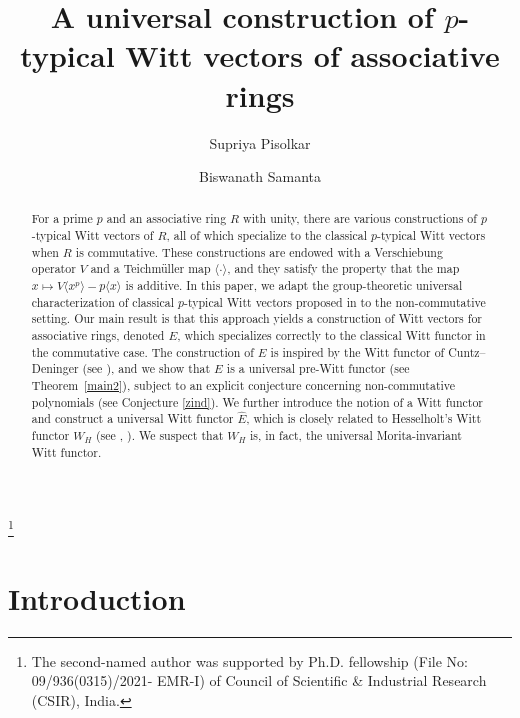 \documentclass[11pt]{amsart}
\theoremstyle{plain}
\theoremstyle{definition}
\newcommand{\ab}[1]{\langle {#1} \rangle}
\begin{document}
\title{A universal construction of $p$-typical Witt vectors of associative rings} 

\author[S. Pisolkar]{Supriya Pisolkar} \address{ Indian Institute of
Science, Education and Research (IISER),  Homi Bhabha Road, Pashan,
Pune - 411008, India}  

\author[B. Samanta] {Biswanath Samanta} \address{ Indian Institute of
Science, Education and Research (IISER),  Homi Bhabha Road, Pashan,
Pune - 411008, India}  

\thanks{The second-named author was supported by Ph.D. fellowship (File No: 09/936(0315)/2021-
EMR-I) of Council of Scientific \& Industrial Research (CSIR), India.} 
\maketitle 
\begin{abstract}
For a prime $p$ and an associative ring $R$ with unity, there are various constructions of $p$-typical Witt vectors of $R$, all of which specialize to the classical $p$-typical Witt vectors when $R$ is commutative. These constructions are endowed with a Verschiebung operator $V$ and a Teichm\"uller map $\ab{\cdot}$, and they satisfy the property that the map $
x \mapsto V\ab{x^p} - p\ab{x}$ is additive. In this paper, we adapt the group-theoretic universal characterization of classical $p$-typical Witt vectors proposed in \cite{ps} to the non-commutative setting. Our main result is that this approach yields a construction of Witt vectors for associative rings, denoted $E$, which specializes correctly to the classical Witt functor in the commutative case. The construction of $E$ is inspired by the Witt functor of Cuntz--Deninger (see \cite{cd}), and we show that $E$ is a universal pre-Witt functor (see Theorem~\ref{main2}), subject to an explicit conjecture concerning non-commutative polynomials (see Conjecture \ref{zind}). We further introduce the notion of a Witt functor and construct a universal Witt functor $\widehat{E}$, which is closely related to Hesselholt’s Witt functor $W_H$ (see \cite{h1}, \cite{h2}). We suspect that $W_H$ is, in fact, the universal Morita-invariant Witt functor.
\end{abstract}
\section{Introduction}
\end{document}
